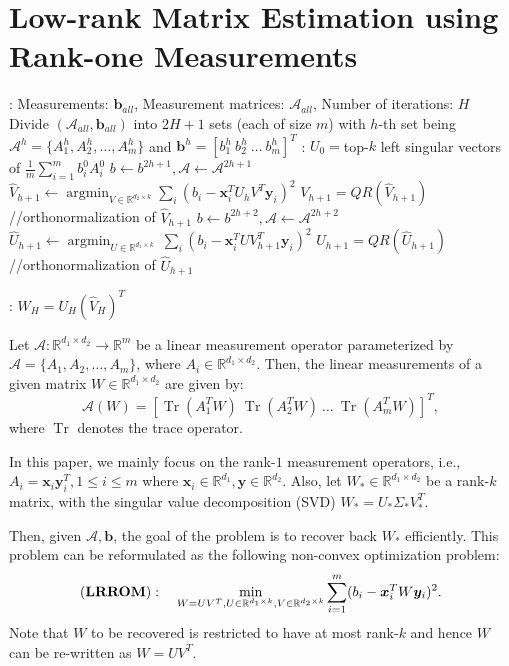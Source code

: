\documentclass[11pt]{article}
\newcommand{\Tr}{\operatorname{Tr}}
\newcommand{\R}{\mathbb{R}}
\newcommand{\tp}[1]{{#1}^{T}}
\DeclareMathOperator*{\argmin}{argmin}
\newcommand{\calA}{\mathcal{A}}
\newcommand{\Vot}{\tp{V}_*}
\newcommand{\So}{\Sigma_*}
\newcommand{\Uo}{U_*}
\newcommand{\Wo}{W_*}
\newcommand{\x}{\bm{x}}
\newcommand{\y}{\bm{y}}
\renewcommand{\b}{\bm{b}}
\begin{document}
\section{Low-rank Matrix Estimation using Rank-one Measurements}\label{sec:formulation}
\begin{algorithm}[t]
\caption{AltMin-\lrrom: Alternating Minimization for \lrrom}
\label{alg:altmin}
  \begin{algorithmic}[1]
    : Measurements: $\b_{all}$, Measurement matrices: $\calA_{all}$, Number of iterations: $H$
    \STATE Divide $(\calA_{all}, \b_{all})$ into $2H+1$ sets (each of size $m$) with $h$-th set being $\calA^h=\{A_1^h,A_2^h,\dots,A_m^h\}$ and $\b^h=[b_1^h\ b_2^h\ \dots\ b_m^h]^T$
    : $U_0=$top-$k$ left singular vectors of $\frac{1}{m}\sum_{i=1}^m b_i^0 A_i^0$
    \STATE $b\leftarrow b^{2h+1}, \calA\leftarrow \calA^{2h+1}$
    \STATE $\widehat{V}_{h+1}\leftarrow \argmin_{V\in \R^{d_2\times k}} \sum_i (b_i-\x_i^TU_h\tp{V}\y_i)^2$
    \STATE $V_{h+1}=QR(\widehat{V}_{h+1})$ //orthonormalization of $\widehat{V}_{h+1}$
    \STATE $b\leftarrow b^{2h+2}, \calA\leftarrow \calA^{2h+2}$
    \STATE $\widehat{U}_{h+1}\leftarrow \argmin_{U\in \mathbb{R}^{d_1\times k}} \  \sum_i (b_i-\x_i^TU\tp{V}_{h+1}\y_i)^2$
    \STATE $U_{h+1}=QR(\widehat{U}_{h+1})$ //orthonormalization of $\widehat{U}_{h+1}$

    \ENDFOR
    : $W_H=U_H(\widehat{V}_H)^T$
  \end{algorithmic}
\end{algorithm}
Let $\calA: \mathbb{R}^{d_1\times d_2}\rightarrow \R^m$ be a linear measurement operator parameterized by $\calA=\{A_1, A_2, \dots, A_m\}$, where $A_i\in \mathbb{R}^{d_1\times d_2}$. Then, the linear measurements of a given matrix $W\in \R^{d_1\times d_2}$ are given by: 
\begin{equation}
  \label{eq:linA}
  \calA(W)=[\Tr(A_1^TW)\ \Tr(A_2^TW)\ \dots\ \Tr(A_m^TW)]^T,
\end{equation}
where $\Tr$ denotes the trace operator. 

In this paper, we mainly focus on the rank-$1$ measurement operators, i.e., $A_i=\x_i\tp{\y}_i, 1\leq i\leq m$ where $\x_i \in \R^{d_1}, \y\in \R^{d_2}$. Also, let $\Wo \in \R^{d_1\times d_2}$ be  a rank-$k$ matrix, with the singular value decomposition (SVD) $\Wo=\Uo\So\Vot$.

Then, given $\calA, \b$, the goal of the \lrrom problem is to recover back $\Wo$ efficiently. This problem can be reformulated as the following non-convex optimization problem:  
\begin{equation}
 \label{eq:r1ms}
 {\bf (\lrrom)}:\ \ \ \min_{W=U\tp{V}, U\in \R^{d_1\times k}, V\in \R^{d_2\times k}} \sum_{i=1}^m (b_i -\tp{\x}_i W \y_i)^2.
\end{equation}
Note that $W$ to be recovered is restricted to have at most rank-$k$ and hence $W$ can be re-written as $W=U\tp{V}$. 
\end{document}
